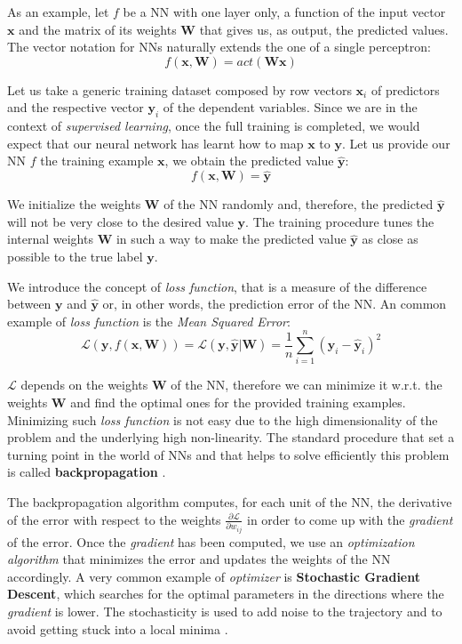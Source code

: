 As an example, let $f$ be a NN with one layer only, a function of the input vector $\textbf{x}$ and the matrix of its weights $\textbf{W}$ that gives us, as output, the predicted values.
The vector notation for NNs naturally extends the one of a single perceptron:
$$ f(\textbf{x}, \textbf{W}) = act(\textbf{W} \textbf{x}) $$

Let us take a generic training dataset composed by row vectors $\textbf{x}_i$ of predictors and the respective vector $\textbf{y}_i$ of the dependent variables.
Since we are in the context of \textit{supervised learning}, once the full training is completed, we would expect that our neural network has learnt how to map $\textbf{x}$ to $\textbf{y}$.
Let us provide our NN $f$ the training example $\textbf{x}$, we obtain the predicted value $\hat{\textbf{y}}$:
$$ f(\textbf{x}, \textbf{W}) = \hat{\textbf{y}} $$

We initialize the weights $\textbf{W}$ of the NN randomly and, therefore, the predicted $\hat{\textbf{y}}$ will not be very close to the desired value $\textbf{y}$.
The training procedure tunes the internal weights $\textbf{W}$ in such a way to make the predicted value $\hat{\textbf{y}}$ as close as possible to the true label $\textbf{y}$.

We introduce the concept of \textit{loss function}, that is a measure of the difference between $\textbf{y}$ and $\hat{\textbf{y}}$ or, in other words, the prediction error of the NN.
An common example of \textit{loss function} is the \textit{Mean Squared Error}:
$$ \mathscr{L}(\textbf{y}, f(\textbf{x}, \textbf{W})) =
\mathscr{L}(\textbf{y}, \hat{\textbf{y}}|\textbf{W}) =
\frac{1}{n} \sum_{i=1}^{n} (\textbf{y}_i - \hat{\textbf{y}}_i)^2 $$

$\mathscr{L}$ depends on the weights $\textbf{W}$ of the NN, therefore we can minimize it w.r.t. the weights $\textbf{W}$ and find the optimal ones for the provided training examples.
Minimizing such \textit{loss function} is not easy due to the high dimensionality of the problem and the underlying high non-linearity.
The standard procedure that set a turning point in the world of NNs and that helps to solve efficiently this problem is called \textbf{backpropagation} \cite{Rumelhart1986}.

The backpropagation algorithm computes, for each unit of the NN, the derivative of the error with respect to the weights $ \frac{\partial \mathscr{L}}{\partial w_{ij}} $ in order to come up with the \textit{gradient} of the error.
Once the \textit{gradient} has been computed, we use an \textit{optimization algorithm} that minimizes the error and updates the weights of the NN accordingly.
A very common example of \textit{optimizer} is \textbf{Stochastic Gradient Descent}, which searches for the optimal parameters in the directions where the \textit{gradient} is lower.
The stochasticity is used to add noise to the trajectory and to avoid getting stuck into a local minima \cite{zhang2004sgd}. 

